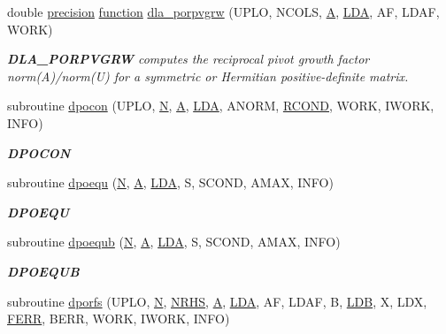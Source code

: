 \begin{DoxyCompactItemize}
double \hyperlink{numinquire_8h_a2c8e616467665d0b2814d4c1589ba74e}{precision} \hyperlink{afunc_8m_a7b5e596df91eadea6c537c0825e894a7}{function} \hyperlink{group__doublePOcomputational_gae755aeaf7b038f598514b34d013953ff}{dla\+\_\+porpvgrw} (U\+P\+L\+O, N\+C\+O\+L\+S, \hyperlink{classA}{A}, \hyperlink{example__user_8c_ae946da542ce0db94dced19b2ecefd1aa}{L\+D\+A}, A\+F, L\+D\+A\+F, W\+O\+R\+K)
\begin{DoxyCompactList}\small\item\em {\bfseries D\+L\+A\+\_\+\+P\+O\+R\+P\+V\+G\+R\+W} computes the reciprocal pivot growth factor norm(\+A)/norm(U) for a symmetric or Hermitian positive-\/definite matrix. \end{DoxyCompactList}\item 
subroutine \hyperlink{group__doublePOcomputational_ga42c90b8fcfef1a8f7c87a45e8176d643}{dpocon} (U\+P\+L\+O, \hyperlink{polmisc_8c_a0240ac851181b84ac374872dc5434ee4}{N}, \hyperlink{classA}{A}, \hyperlink{example__user_8c_ae946da542ce0db94dced19b2ecefd1aa}{L\+D\+A}, A\+N\+O\+R\+M, \hyperlink{superlu__enum__consts_8h_af00a42ecad444bbda75cde1b64bd7e72a9b5c151728d8512307565994c89919d5}{R\+C\+O\+N\+D}, W\+O\+R\+K, I\+W\+O\+R\+K, I\+N\+F\+O)
\begin{DoxyCompactList}\small\item\em {\bfseries D\+P\+O\+C\+O\+N} \end{DoxyCompactList}\item 
subroutine \hyperlink{group__doublePOcomputational_gae83b3e94a9fce827c8a7c547d134d9e6}{dpoequ} (\hyperlink{polmisc_8c_a0240ac851181b84ac374872dc5434ee4}{N}, \hyperlink{classA}{A}, \hyperlink{example__user_8c_ae946da542ce0db94dced19b2ecefd1aa}{L\+D\+A}, S, S\+C\+O\+N\+D, A\+M\+A\+X, I\+N\+F\+O)
\begin{DoxyCompactList}\small\item\em {\bfseries D\+P\+O\+E\+Q\+U} \end{DoxyCompactList}\item 
subroutine \hyperlink{group__doublePOcomputational_ga771aa24ef6fe09d905031c56adf64a62}{dpoequb} (\hyperlink{polmisc_8c_a0240ac851181b84ac374872dc5434ee4}{N}, \hyperlink{classA}{A}, \hyperlink{example__user_8c_ae946da542ce0db94dced19b2ecefd1aa}{L\+D\+A}, S, S\+C\+O\+N\+D, A\+M\+A\+X, I\+N\+F\+O)
\begin{DoxyCompactList}\small\item\em {\bfseries D\+P\+O\+E\+Q\+U\+B} \end{DoxyCompactList}\item 
subroutine \hyperlink{group__doublePOcomputational_ga12e83769d4dadac84d9c1509f802efa4}{dporfs} (U\+P\+L\+O, \hyperlink{polmisc_8c_a0240ac851181b84ac374872dc5434ee4}{N}, \hyperlink{example__user_8c_aa0138da002ce2a90360df2f521eb3198}{N\+R\+H\+S}, \hyperlink{classA}{A}, \hyperlink{example__user_8c_ae946da542ce0db94dced19b2ecefd1aa}{L\+D\+A}, A\+F, L\+D\+A\+F, B, \hyperlink{example__user_8c_a50e90a7104df172b5a89a06c47fcca04}{L\+D\+B}, X, L\+D\+X, \hyperlink{superlu__enum__consts_8h_af00a42ecad444bbda75cde1b64bd7e72a78fd14d7abebae04095cfbe02928f153}{F\+E\+R\+R}, B\+E\+R\+R, W\+O\+R\+K, I\+W\+O\+R\+K, I\+N\+F\+O)

\end{DoxyCompactItemize}
